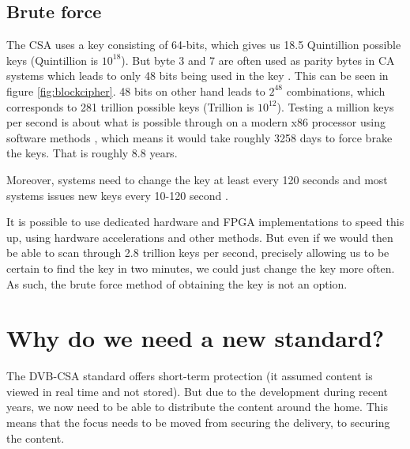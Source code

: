 \subsection{Brute force}
The CSA uses a key consisting of 64-bits, which gives us 18.5 Quintillion 
possible keys (Quintillion is $10^{18}$). But byte 3 and 7 are often used as 
parity bytes in CA systems which leads to only 48 bits being used in the key 
\citep{Breaking:2012}. This can be seen in figure \ref{fig:blockcipher}. 48 bits 
on other hand leads to $2^{48}$ combinations, which corresponds to 281 trillion 
possible keys (Trillion is $10^{12}$). Testing a million keys per second is about 
what is possible through on a modern x86 processor using software methods
, which means it would take roughly 
3258 days to force brake the keys. That is roughly 8.8 years.

Moreover, systems need to change the key at least every 120 seconds \citep{Simpson:2009} and most systems issues new keys every 10-120 second \citep{Wirt:2004}.

It is possible to use dedicated hardware and FPGA implementations to speed this 
up, using hardware accelerations and other methods. But even if we would then 
be able to scan through 2.8 trillion keys per second, precisely allowing us to 
be certain to find the key in two minutes, we could just change the key more 
often. As such, the brute force method of obtaining the key is not an option.



\section{Why do we need a new standard?}
The DVB-CSA standard offers short-term protection (it assumed content is viewed 
in real time and not stored). But due to the development during recent years, 
we now need to be able to distribute the content around the home. This means 
that the focus needs to be moved from securing the delivery, to securing the 
content. \citep{Farncombe}



